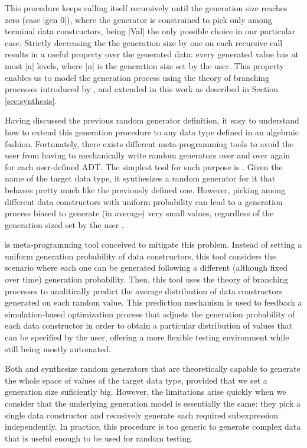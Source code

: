 This procedure keeps calling itself recursively until the generation size
reaches zero (case |gen 0|), where the generator is constrained to pick only
among terminal data constructors, being |Val| the only possible choice in our
particular case.
%
Strictly decreasing the the generation size by one on each recursive call
results in a useful property over the generated data: every generated value has
at most |n| levels, where |n| is the generation size set by the user.
%
This property enables us to model the generation process using the theory of
branching processes introduced by \tocite, and extended in this work as
described in Section \ref{sec:synthesis}.


Having discussed the previous random generator definition, it easy to understand
how to extend this generation procedure to any data type defined in an algebraic
fashion.
%
Fortunately, there exists different meta-programming tools to avoid the user
from having to mechanically write random generators over and over again for each
user-defined ADT.
%
The simplest tool for such purpose is \megadeth.
%
Given the name of the target data type, it synthesizes a random generator for it
that behaves pretty much like the previously defined one.
%
However, picking among different data constructors with uniform probability can
lead to a generation process biased to generate (in average) very small values,
regardless of the generation sized set by the user \tocite.

\dragen is meta-programming tool conceived to mitigate this problem.
%
Instead of setting a uniform generation probability of data constructors, this
tool considers the scenario where each one can be generated following a
different (although fixed over time) generation probability.
%
Then, this tool uses the theory of branching processes to analitically predict
the average distribution of data constructors generated on each random value.
%
This prediction mechanism is used to feedback a simulation-based optimization
process that adjusts the generation probability of each data constructor in
order to obtain a particular distribution of values that can be specified by the
user, offering a more flexible testing environment while still being mostly
automated.


Both \megadeth and \dragen synthesize random generators that are theoretically
capable to generate the whole space of values of the target data type, provided
that we set a generation size suficiently big.
%
However, the limitations arise quickly when we consider that the underlying
generation model is essentially the same: they pick a single data constructor
and recusively generate each required subexpression independently.
%
In practice, this procedure is too generic to generate complex data that is
useful enough to be used for random testing.


